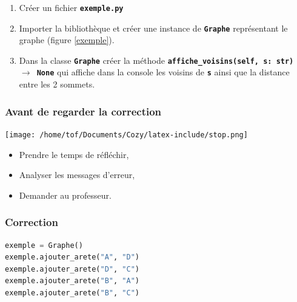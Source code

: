 \documentclass[svgnames,11pt]{beamer}
\begin{document}
\begin{frame}
    \frametitle{}
    \begin{center}
        \label{exemple}
    \end{center}
    \begin{activite}
    \begin{enumerate}
        \item Créer un fichier \textbf{\texttt{exemple.py}}
        \item Importer la bibliothèque et créer une instance de \textbf{\texttt{Graphe}} représentant le graphe (figure \ref{exemple}).
        \item Dans la classe \textbf{\texttt{Graphe}} créer la méthode \textbf{\texttt{affiche\_voisins(self, s: str) $\rightarrow$ None}} qui affiche dans la console les voisins de \textbf{\texttt{s}} ainsi que la distance entre les 2 sommets. 
    \end{enumerate}
    \end{activite}

\end{frame}
\begin{frame}
    \frametitle{Avant de regarder la correction}
\begin{center}
    \centering
    \texttt{[image: /home/tof/Documents/Cozy/latex-include/stop.png]}
    \end{center}
{\Large
    \begin{itemize}
        \item Prendre le temps de réfléchir,
        \item Analyser les messages d'erreur,
        \item Demander au professeur.
    \end{itemize}
}
\end{frame}
\begin{frame}[fragile]
    \frametitle{Correction}

\begin{center}
\begin{lstlisting}[language=Python , basicstyle=\ttfamily\small, xleftmargin=2em, xrightmargin=2em]
exemple = Graphe()
exemple.ajouter_arete("A", "D")
exemple.ajouter_arete("D", "C")
exemple.ajouter_arete("B", "A")
exemple.ajouter_arete("B", "C")
\end{lstlisting}
\label{CODE}
\end{center}

\end{frame}
\end{document}
